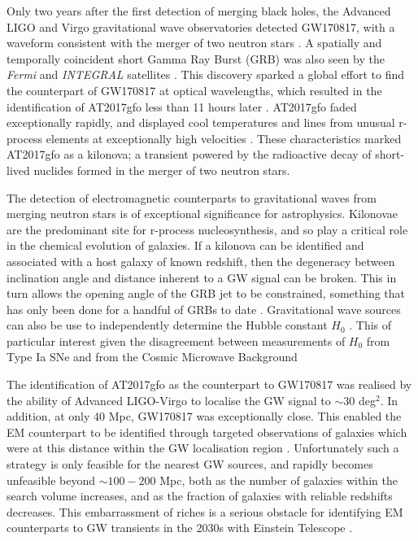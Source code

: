 \documentclass{aa}
\begin{document}
Only two years after the first detection of merging black holes, the Advanced LIGO and Virgo gravitational wave observatories detected GW170817, with a waveform consistent with the merger of two neutron stars \citep{GW170817}. A spatially and temporally coincident short Gamma Ray Burst (GRB) was also seen by the {\it Fermi} and {\it INTEGRAL} satellites \citep{GW170817_GRB}. This discovery sparked a global effort to find the counterpart of GW170817 at optical wavelengths, which resulted in the identification of AT2017gfo less than 11 hours later \citep{GW170817_EM}. AT2017gfo faded exceptionally rapidly, and displayed cool temperatures and lines from unusual r-process elements at exceptionally high velocities \citep{Smar17,Arca17,Pian17,Coul17,Kilp17}. These characteristics marked AT2017gfo as a kilonova; a transient powered by the radioactive decay of short-lived nuclides formed in the merger of two neutron stars.

The detection of electromagnetic counterparts to gravitational waves from merging neutron stars is of exceptional significance for astrophysics. Kilonovae are the predominant site for r-process nucleosynthesis, and so play a critical role in the chemical evolution of galaxies. If a kilonova can be identified and associated with a host galaxy of known redshift, then the degeneracy between inclination angle and distance inherent to a GW signal can be broken. This in turn allows the opening angle of the GRB jet to be constrained, something that has only been done for a handful of GRBs to date \citep{2018ApJ...857..128J}. Gravitational wave sources can also be use to independently determine the Hubble constant $H_0$ \citep{GWH0}. This of particular interest given the disagreement between measurements of $H_0$ from Type Ia SNe and from the Cosmic Microwave Background \citep[e.g.,][]{Bern16}

The identification of AT2017gfo as the counterpart to GW170817 was realised by the 
ability of Advanced LIGO-Virgo to localise the GW signal to $\sim$30 deg$^2$.
In addition, at only 40 Mpc, GW170817 was exceptionally close. This enabled the EM counterpart to be identified through targeted observations of galaxies which were at this distance within the GW localisation region \citep{Coul17}. Unfortunately such a strategy is only feasible for the nearest GW sources, and rapidly becomes unfeasible beyond $\sim100-200$ Mpc, both as the number of galaxies within the search volume increases, and as the fraction of galaxies with reliable redshifts decreases. 
This embarrassment of riches is a serious obstacle for identifying EM counterparts to GW transients in the 2030s with Einstein Telescope \citep{ET_doc}.
\end{document}
